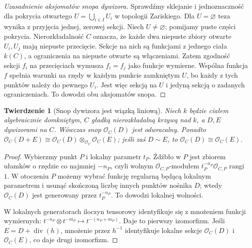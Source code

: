 \documentclass[11pt,a4paper,openany]{report}
\numberwithin{equation}{section}
\theoremstyle{plain}
\newtheorem{twierdzenie}{Twierdzenie}[section]
\theoremstyle{definition}
\theoremstyle{remark}
\begin{document}
\begin{proof}[Uzasadnienie aksjomatów snopa dywizora]
Sprawdźmy sklejanie i jednoznaczność dla pokrycia
otwartego $U=\bigcup_{i\in I}U_i$ w topologii Zariskiego.
Dla $U=\varnothing$ teza wynika z przyjęcia jednej,
zerowej sekcji. Niech $U\ne\varnothing$; pomijamy
puste części pokrycia. Nierozkładalność $C$ oznacza,
że każde dwa niepuste zbiory otwarte $U_i,U_j$
mają niepuste przecięcie. Sekcje na nich są
funkcjami z jednego ciała $k(C)$, a ograniczenia
na niepuste otwarte są włączeniami. Zatem zgodność
sekcji $f_i$ na przecięciach wymusza
$f_i=f_j$ jako funkcje wymierne. Wspólna funkcja
$f$ spełnia warunki na rzędy w każdym punkcie
zamkniętym $U$, bo każdy z tych punktów należy
do pewnego $U_i$. Jest więc sekcją na $U$
i jedyną sekcją o zadanych ograniczeniach.
To dowodzi obu aksjomatów snopa.
\end{proof}

\begin{twierdzenie}[Snop dywizora jest wiązką liniową]
\label{tw:O-D-invertible}
Niech $k$ będzie ciałem algebraicznie domkniętym,
$C$ gładką nierozkładalną krzywą nad $k$,
a $D,E$ dywizorami na $C$.
Wówczas snop $\mathcal O_C(D)$ jest odwracalny.
Ponadto $\mathcal O_C(D+E)\cong
\mathcal O_C(D)\otimes_{\mathcal O_C}\mathcal O_C(E)$;
jeśli zaś $D\sim E$, to
$\mathcal O_C(D)\cong\mathcal O_C(E)$.
\end{twierdzenie}
\begin{proof}
Wybierzmy punkt $P$ i lokalny parametr $t_P$.
Źdźbło w $P$ jest zbiorem ułamków o rzędzie
co najmniej $-n_P$, czyli wolnym
$\mathcal O_{C,P}$-modułem $t_P^{-n_P}\mathcal O_{C,P}$
rangi $1$. W otoczeniu $P$ możemy wybrać
funkcję regularną będącą lokalnym parametrem
i usunąć skończoną liczbę innych punktów nośnika
$D$; wtedy $\mathcal O_C(D)$ jest generowany
przez $t_P^{-n_P}$. To dowodzi lokalnej wolności.

W lokalnych generatorach iloczyn tensorowy
identyfikuje się z mnożeniem funkcji wymiernych:
$t^{-n_P}\otimes t^{-m_P}\mapsto t^{-(n_P+m_P)}$.
Daje to pierwszy izomorfizm. Jeśli
$E=D+\operatorname{div}(h)$, mnożenie przez
$h^{-1}$ identyfikuje lokalne sekcje
$\mathcal O_C(D)$ i $\mathcal O_C(E)$,
co daje drugi izomorfizm.
\end{proof}
\end{document}
